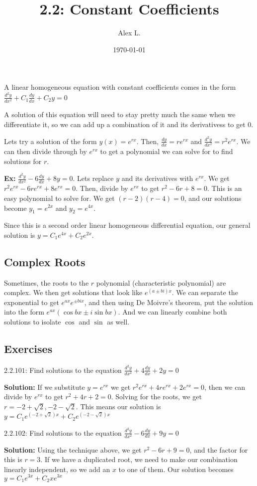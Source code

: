 \documentclass{article}
\title{2.2: Constant Coefficients}
\author{Alex L.}
\date{\today}
\begin{document}
\maketitle

A linear homogeneous equation with constant coefficients comes in the form $\frac{d^2y}{dx^2} + C_1 \frac{dy}{dx} + C_2 y = 0$

A solution of this equation will need to stay pretty much the same when we differentiate it, so we can add up a combination of it and its derivativess to get $0$. 

Lets try a solution of the form $y(x) = e^{rx}$. Then, $\frac{dy}{dx} = re^{rx}$ and $\frac{d^2y}{dx^2} = r^2e^{rx}$. We can then divide through by $e^{rx}$ to get a polynomial we can solve for to find solutions for $r$.

\textbf{Ex:} $\frac{d^2y}{dx^2} - 6 \frac{dy}{dx} + 8y = 0$. Lets replace $y$ and its derivatives with $e^{rx}$. We get $r^2e^{rx} - 6re^{rx} + 8e^{rx} = 0$. Then, divide by $e^{rx}$ to get $r^2 - 6r + 8 = 0$. This is an easy polynomial to solve for. We get $(r-2)(r-4) = 0$, and our solutions become $y_1 = e^{2x}$ and $y_2 = e^{4x}$. 

Since this is a second order linear homogeneous differential equation, our general solution is $y = C_1e^{4x} + C_2e^{2x}$.

\subsection{Complex Roots}

Sometimes, the roots to the $r$ polynomial (characteristic polynomial) are complex. We then get solutions that look like $e^{(a\pm bi)x}$. We can separate the exponential to get $e^{ax}e^{\pm bix}$, and then using De Moivre's theorem, put the solution into the form $e^{ax}(\cos bx \pm i\sin bx)$. And we can linearly combine both solutions to isolate $\cos$ and $\sin$ as well. 

\subsection{Exercises}

$2.2.101$: Find solutions to the equation $\frac{d^2y}{dx^2} + 4 \frac{dy}{dx} + 2y = 0$

\textbf{Solution:} If we substitute $y = e^{rx}$ we get $r^2 e^{rx} + 4re^{rx} + 2e^{rx} = 0$, then we can divide by $e^{rx}$ to get $r^2 + 4r + 2 = 0$. Solving for the roots, we get $r = -2 + \sqrt{2}, -2 - \sqrt{2}$. This means our solution is $y=C_1e^{(-2 + \sqrt{2})x} + C_2 e^{(-2 - \sqrt{2}) x}$

$2.2.102$: Find solutions to the equation $\frac{d^2y}{dx^2} -6\frac{dy}{dx} + 9y = 0$

\textbf{Solution:} Using the technique above, we get $r^2 -6r + 9 = 0$, and the factor for this is $r = 3$. If we have a duplicated root, we need to make our combination linearly independent, so we add an $x$ to one of them. Our solution becomes $y= C_1e^{3x} + C_2xe^{3x}$
\end{document}
